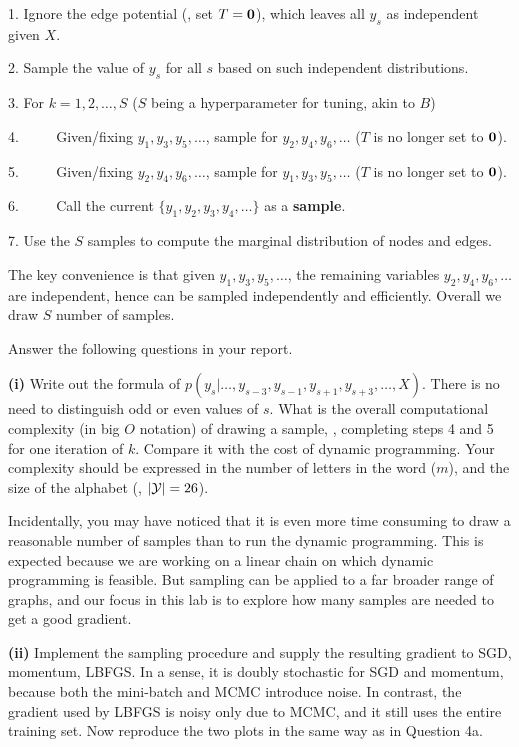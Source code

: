 \documentclass[11pt]{report}
\begin{document}
\begin{itemize}
	1. Ignore the edge potential (\ie, set $T=\mathbf{0}$), which leaves all $y_s$ as independent given $X$.
	
	2. Sample the value of $y_s$ for all $s$ based on such independent distributions.
	
	3. For $k = 1, 2, \ldots, S$ ($S$ being a hyperparameter for tuning, akin to $B$)
	
	4. $\qquad$ Given/fixing $y_1, y_3, y_5, \ldots$, sample for $y_2, y_4, y_6, \ldots$ ($T$ is no longer set to $\mathbf{0}$).
	
	5. $\qquad$ Given/fixing $y_2, y_4, y_6, \ldots$, sample for $y_1, y_3, y_5, \ldots$ ($T$ is no longer set to $\mathbf{0}$).
	
	6. $\qquad$ Call the current $\{y_1, y_2, y_3, y_4, \ldots\}$ as a \textbf{sample}.
	
	7. Use the $S$ samples to compute the marginal distribution of nodes and edges.
	
	The key convenience is that given $y_1, y_3, y_5, \ldots$, 
	the remaining variables $y_2, y_4, y_6, \ldots$ are independent, hence can be sampled independently and efficiently.
	Overall we draw $S$ number of samples.
	
	
	
	
	Answer the following questions in your report.
	
	\textbf{(i)} 
	Write out the formula of $p(y_s|\ldots, y_{s-3}, y_{s-1}, y_{s+1}, y_{s+3}, \ldots, X)$.
	There is no need to distinguish odd or even values of $s$. 
	What is the overall computational complexity (in big $O$ notation) of drawing a sample, \ie, completing steps 4 and 5 for one iteration of $k$.
	Compare it with the cost of dynamic programming.
	Your complexity should be expressed in the number of letters in the word ($m$),
	and the size of the alphabet (\ie, $\left|\mathcal{Y}\right|=26$).
	
	Incidentally, you may have noticed that it is even more time consuming to draw a reasonable number of samples than to run the dynamic programming.
	This is expected because we are working on a linear chain on which dynamic programming is feasible.
	But sampling can be applied to a far broader range of graphs,
	and our focus in this lab is to explore how many samples are needed to get a good gradient.
	
	\textbf{(ii)} 
	Implement the sampling procedure and supply the resulting gradient to SGD, momentum, LBFGS.
	In a sense, it is doubly stochastic for SGD and momentum, because both the mini-batch and MCMC introduce noise. 
	In contrast, the gradient used by LBFGS is noisy only due to MCMC,
	and it still uses the entire training set.
	Now reproduce the two plots in the same way as in Question 4a.


\end{itemize}
\end{document}
